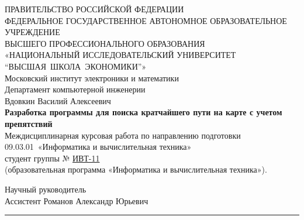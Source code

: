 \begin{titlepage}
        \begin{center}
        ПРАВИТЕЛЬСТВО РОССИЙСКОЙ ФЕДЕРАЦИИ\\
        ФЕДЕРАЛЬНОЕ ГОСУДАРСТВЕННОЕ АВТОНОМНОЕ ОБРАЗОВАТЕЛЬНОЕ УЧРЕЖДЕНИЕ\\
        ВЫСШЕГО ПРОФЕССИОНАЛЬНОГО ОБРАЗОВАНИЯ\\
       «НАЦИОНАЛЬНЫЙ ИССЛЕДОВАТЕЛЬСКИЙ УНИВЕРСИТЕТ\\“ВЫСШАЯ~ШКОЛА~ЭКОНОМИКИ”»
        \\
        \bigskip
        Московский институт электроники и математики\\
        Департамент компьютерной инженерии\\
        Вдовкин Василий Алексеевич\\
        \bigskip
        \textbf{Разработка программы для поиска кратчайшего пути на карте с учетом препятствий}\\
        \bigskip
        Междисциплинарная курсовая работа по направлению подготовки 09.03.01~«Информатика и вычислительная техника»\\
        студент группы № \underline{ИВТ-11}\\
        (образовательная программа «Информатика и вычислительная техника»).\\
        \bigskip
        \bigskip
        \bigskip
        \end{center}
        \begin{flushright}
            Научный руководитель\\
            Ассистент Романов Александр Юрьевич\\
            \rule{11em}{.1pt}
        \end{flushright}
        \vfill{}
        
    \end{titlepage}
